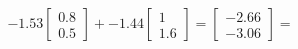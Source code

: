 \documentclass[preview]{standalone}
\begin{document}
\begin{align*}
-1.53 \begin{bmatrix} 0.8 \\ 0.5 \end{bmatrix} + -1.44 \begin{bmatrix} 1 \\ 1.6 \end{bmatrix} = \begin{bmatrix} -2.66 \\ -3.06 \end{bmatrix} =
\end{align*}
\end{document}
